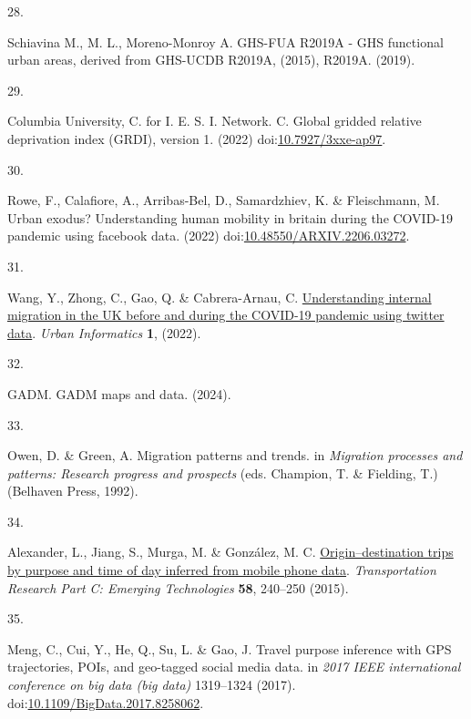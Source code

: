 \documentclass[
  11pt,
]{article}
\newlength{\cslhangindent}
\newlength{\csllabelwidth}
\newlength{\cslentryspacingunit} %
\newenvironment{CSLReferences}[2] %
 {%
  \setlength{\parindent}{0pt}
  \ifodd #1
  \let\oldpar\par
  \def\par{\hangindent=\cslhangindent\oldpar}
  \fi
  \setlength{\parskip}{#2\cslentryspacingunit}
 }%
 {}
\newcommand{\CSLLeftMargin}[1]{\parbox[t]{\csllabelwidth}{#1}}
\newcommand{\CSLRightInline}[1]{\parbox[t]{\linewidth - \csllabelwidth}{#1}\break}
\begin{document}
\begin{CSLReferences}{0}{0}
\leavevmode{}%
\CSLLeftMargin{28. }%
\CSLRightInline{Schiavina M., M. L., Moreno-Monroy A. GHS-FUA R2019A -
GHS functional urban areas, derived from GHS-UCDB R2019A, (2015),
R2019A. (2019).}

\leavevmode{}%
\CSLLeftMargin{29. }%
\CSLRightInline{Columbia University, C. for I. E. S. I. Network. C.
Global gridded relative deprivation index (GRDI), version 1. (2022)
doi:\href{https://doi.org/10.7927/3xxe-ap97}{10.7927/3xxe-ap97}.}

\leavevmode{}%
\CSLLeftMargin{30. }%
\CSLRightInline{Rowe, F., Calafiore, A., Arribas-Bel, D., Samardzhiev,
K. \& Fleischmann, M. Urban exodus? Understanding human mobility in
britain during the COVID-19 pandemic using facebook data. (2022)
doi:\href{https://doi.org/10.48550/ARXIV.2206.03272}{10.48550/ARXIV.2206.03272}.}

\leavevmode{}%
\CSLLeftMargin{31. }%
\CSLRightInline{Wang, Y., Zhong, C., Gao, Q. \& Cabrera-Arnau, C.
\href{https://doi.org/10.1007/s44212-022-00018-w}{Understanding internal
migration in the UK before and during the COVID-19 pandemic using
twitter data}. \emph{Urban Informatics} \textbf{1}, (2022).}

\leavevmode{}%
\CSLLeftMargin{32. }%
\CSLRightInline{GADM. GADM maps and data. (2024).}

\leavevmode{}%
\CSLLeftMargin{33. }%
\CSLRightInline{Owen, D. \& Green, A. Migration patterns and trends. in
\emph{Migration processes and patterns: Research progress and prospects}
(eds. Champion, T. \& Fielding, T.) (Belhaven Press, 1992).}

\leavevmode{}%
\CSLLeftMargin{34. }%
\CSLRightInline{Alexander, L., Jiang, S., Murga, M. \& González, M. C.
\href{https://doi.org/10.1016/j.trc.2015.02.018}{Origin--destination
trips by purpose and time of day inferred from mobile phone data}.
\emph{Transportation Research Part C: Emerging Technologies}
\textbf{58}, 240--250 (2015).}

\leavevmode{}%
\CSLLeftMargin{35. }%
\CSLRightInline{Meng, C., Cui, Y., He, Q., Su, L. \& Gao, J. Travel
purpose inference with GPS trajectories, POIs, and geo-tagged social
media data. in \emph{2017 IEEE international conference on big data (big
data)} 1319--1324 (2017).
doi:\href{https://doi.org/10.1109/BigData.2017.8258062}{10.1109/BigData.2017.8258062}.}


\end{CSLReferences}
\end{document}
